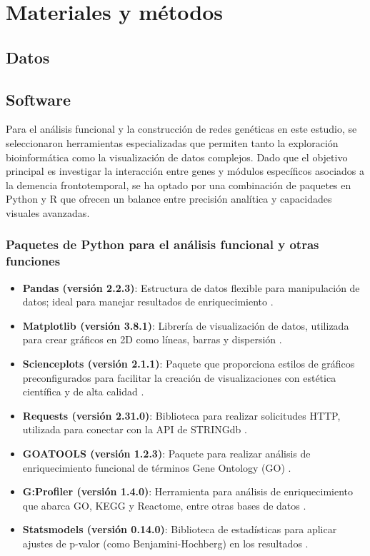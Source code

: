 \section{Materiales y métodos}

\subsection{Datos}

\subsection{Software}

Para el análisis funcional y la construcción de redes genéticas en este estudio, se seleccionaron herramientas especializadas que permiten tanto la exploración bioinformática como la visualización de datos complejos. Dado que el objetivo principal es investigar la interacción entre genes y módulos específicos asociados a la demencia frontotemporal, se ha optado por una combinación de paquetes en Python y R que ofrecen un balance entre precisión analítica y capacidades visuales avanzadas.

\subsubsection*{Paquetes de Python para el análisis funcional y otras funciones}

\begin{itemize}
	\item \textbf{Pandas (versión 2.2.3)}: Estructura de datos flexible para manipulación de datos; ideal para manejar resultados de enriquecimiento \cite{pandas}.
	\item \textbf{Matplotlib (versión 3.8.1)}: Librería de visualización de datos, utilizada para crear gráficos en 2D como líneas, barras y dispersión \cite{matplotlib}.
	\item \textbf{Scienceplots (versión 2.1.1)}: Paquete que proporciona estilos de gráficos preconfigurados para facilitar la creación de visualizaciones con estética científica y de alta calidad \cite{scienceplots}.
	\item \textbf{Requests (versión 2.31.0)}: Biblioteca para realizar solicitudes HTTP, utilizada para conectar con la API de STRINGdb \cite{requests}.
	\item \textbf{GOATOOLS (versión 1.2.3)}: Paquete para realizar análisis de enriquecimiento funcional de términos Gene Ontology (GO) \cite{goatools}.
	\item \textbf{G:Profiler (versión 1.4.0)}: Herramienta para análisis de enriquecimiento que abarca GO, KEGG y Reactome, entre otras bases de datos \cite{gprofiler}.
	\item \textbf{Statsmodels (versión 0.14.0)}: Biblioteca de estadísticas para aplicar ajustes de p-valor (como Benjamini-Hochberg) en los resultados \cite{statsmodels}.
\end{itemize}

